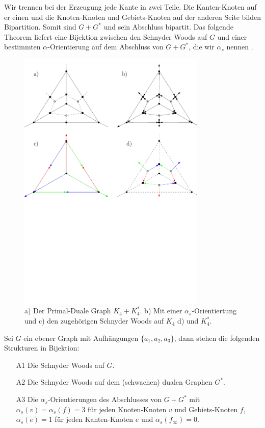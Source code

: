 Wir trennen bei der Erzeugung jede Kante in zwei Teile. Die Kanten-Knoten auf er einen und die Knoten-Knoten und Gebiets-Knoten auf der anderen Seite bilden Bipartition. Somit sind $G+G^*$ und sein Abschluss bipartit. Das folgende Theorem liefert eine Bijektion zwischen den Schnyder Woods auf $G$ und einer bestimmten $\alpha$-Orientierung auf dem Abschluss von $G+G^*$, die wir $\alpha_s$ nennen \cite[Propositionen 2.13, 2.14]{felsner04}.

\begin{figure}
	\centering
	\includegraphics[width=0.8\textwidth]{alpha_ex.pdf}
  \caption{a) Der Primal-Duale Graph $K_4+K_4^*$. b) Mit einer $\alpha_s$-Orientiertung und c) den zugehörigen Schnyder Woods auf $K_4$ d) und $K^*_4$. }
  \label{alpha_ex}
\end{figure}

\begin{theorem}\label{alpha_bij}
Sei $G$ ein ebener Graph mit Aufhängungen $\{a_1,a_2,a_3\}$, dann stehen die folgenden Strukturen in Bijektion:
\begin{itemize}
\item [A1] Die Schnyder Woods auf $G$.
\item [A2] Die Schnyder Woods auf dem (schwachen) dualen Graphen $G^*$.
\item [A3] Die $\alpha_{s}$-Orientierungen des Abschlusses von $G+G^*$ mit $\alpha_s(v) = \alpha_s(f) = 3$ für jeden Knoten-Knoten $v$ und Gebiets-Knoten $f$,  $\alpha_s(e) = 1$ für jeden Kanten-Knoten $e$ und  $\alpha_s(f_\infty) = 0$.
\end{itemize}
\end{theorem}

